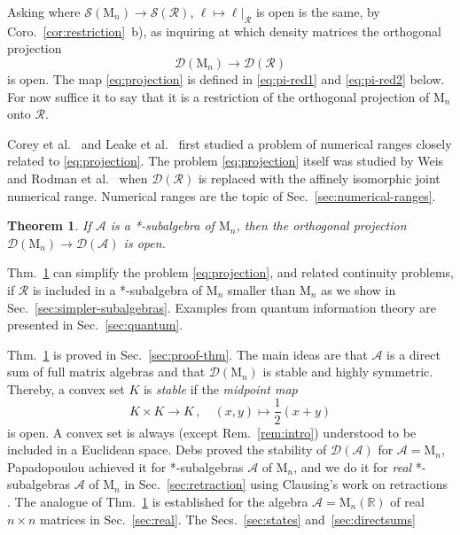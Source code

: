 \documentclass[a4paper,11pt,reqno]{amsart}
\newcommand{\R}{\mathbb{R}}
\newcommand{\M}{\mathrm{M}}
\newcommand{\cA}{\mathcal{A}}
\newcommand{\cD}{\mathcal{D}}
\newcommand{\cR}{\mathcal{R}}
\newcommand{\cS}{\mathcal{S}}
\newtheorem{thm}{Theorem}[section]
\theoremstyle{definition}
\theoremstyle{remark}
\numberwithin{equation}{section}
\begin{document}
%
Asking where $\cS(\M_n)\to\cS(\cR)$, $\ell\mapsto\ell|_{\cR}$ is open is the
same, by Coro.~\ref{cor:restriction}~b), as inquiring at which density 
matrices the orthogonal projection
\begin{equation}\label{eq:projection}
\cD(\M_n)\to\cD(\cR)
\end{equation}
is open. The map \eqref{eq:projection} is defined in \eqref{eq:pi-red1} and 
\eqref{eq:pi-red2} below. For now suffice it to say that it is a restriction 
of the orthogonal projection of $\M_n$ onto $\cR$. 
\par
% 
Corey et al.~\cite{Corey-etal2013} and Leake et 
al.~\cite{Leake-etal2014-preimages,Leake-etal2014-inverse} first studied a 
problem of numerical ranges closely related to \eqref{eq:projection}. The 
problem \eqref{eq:projection} itself was studied by Weis \cite{Weis2014,Weis2016} 
and Rodman et al.~\cite{Rodman-etal2016} when $\cD(\cR)$ is replaced with 
the affinely isomorphic joint numerical range. Numerical ranges are the 
topic of Sec.~\ref{sec:numerical-ranges}. 
\par
%
\begin{thm}\label{thm:Aopen}
If $\cA$ is a *-subalgebra of $\M_n$, then the orthogonal projection 
$\cD(\M_n)\to\cD(\cA)$ is open.
\end{thm}
%
Thm.~\ref{thm:Aopen} can simplify the problem \eqref{eq:projection}, and 
related continuity problems, if $\cR$ is included in a *-subalgebra of 
$\M_n$ smaller than $\M_n$ as we show in Sec.~\ref{sec:simpler-subalgebras}. 
Examples from quantum information theory are presented in 
Sec.~\ref{sec:quantum}.
\par
%
Thm.~\ref{thm:Aopen} is proved in Sec.~\ref{sec:proof-thm}. The main ideas 
are that $\cA$ is a direct sum of full matrix algebras and that $\cD(\M_n)$ 
is stable and highly symmetric. Thereby, a convex set $K$ is \emph{stable} 
if the \emph{midpoint map}
\[\textstyle
K\times K\to K\,,
\quad
(x,y)\mapsto\frac{1}{2}(x+y)
\]
is open. A convex set is always (except Rem.~\ref{rem:intro}) understood to 
be included in a Euclidean space. Debs \cite{Debs1979} proved the stability 
of $\cD(\cA)$ for $\cA=\M_n$, Papadopoulou \cite{Papadopoulou1982} achieved 
it for *-subalgebras $\cA$ of $\M_n$, and we do it for \emph{real} 
*-subalgebras $\cA$ of $\M_n$ in Sec.~\ref{sec:retraction} using Clausing's 
work on retractions \cite{Clausing1978}. The analogue of Thm.~\ref{thm:Aopen} 
is established for the algebra $\cA=\M_n(\R)$ of real $n\times n$ matrices 
in Sec.~\ref{sec:real}. The Secs.~\ref{sec:states} and~\ref{sec:directsums} 
\end{document}
